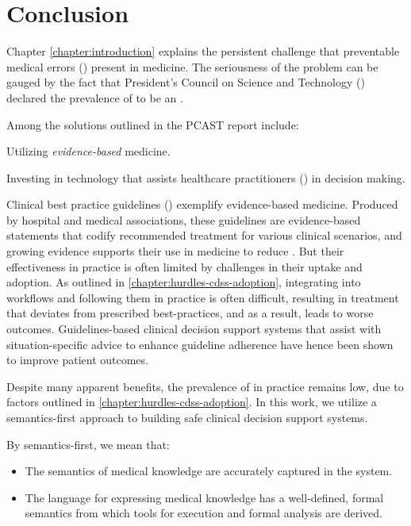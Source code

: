 \chapter{Conclusion}\label{chapter:conclusion}

Chapter \ref{chapter:introduction} explains the persistent challenge
that preventable medical errors (\PMEs{}) present in medicine.
The seriousness of the problem can be gauged by the fact that
President's Council on Science and Technology (\PCAST{})
declared the prevalence of \PMEs{} to be an
.

Among the solutions
outlined in the PCAST{} report include:
\begin{enumerate*}[label=(\roman*)]
  \item Utilizing \emph{evidence-based} medicine.
  \item Investing in technology that assists healthcare
  practitioners (\HCPs{}) in decision making.
\end{enumerate*}
Clinical best practice guidelines (\BPGs{}) exemplify evidence-based medicine.
Produced by hospital and medical associations, these guidelines
are evidence-based statements that codify recommended treatment for
various clinical scenarios, and growing evidence supports their use
in medicine to reduce \PMEs{}. But their effectiveness in practice is often
limited by challenges in their uptake and adoption. As outlined in
\autoref{chapter:hurdles-cdss-adoption}, integrating \BPGs{} into \HCP{} workflows
and following them in practice is often difficult, resulting in treatment
that deviates from prescribed best-practices, and as a result, leads to
worse outcomes. Guidelines-based clinical decision support systems
that assist \HCPs{} with situation-specific advice to enhance guideline
adherence have hence been shown to improve patient outcomes.

Despite many apparent benefits, the prevalence of \CDSSs{} in practice
remains low, due to factors outlined in \autoref{chapter:hurdles-cdss-adoption}.
In this work, we utilize a semantics-first approach to building safe clinical
decision support systems.

By semantics-first, we mean that:
\begin{itemize}
  \item The semantics of medical knowledge are accurately captured in the
  system.
  \item The language for expressing medical knowledge has a well-defined, formal
  semantics from which tools for execution and formal analysis are derived.
\end{itemize}

